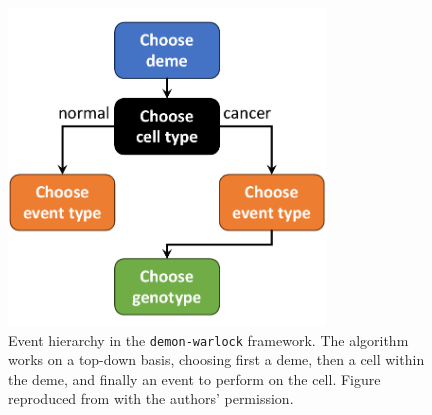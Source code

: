 \begin{figure}[h]
    \centering
    \includegraphics[width=0.75\textwidth]{Chapter_1/figures/demon_hierarchy.pdf}
    \caption{Event hierarchy in the \texttt{demon-warlock} framework. The
    algorithm works on a top-down basis, choosing first a deme, then a cell
    within the deme, and finally an event to perform on the cell. Figure
    reproduced from \cite{bak_warlock_2023} with the authors' permission.}
    \label{fig:demon_events}
\end{figure}

